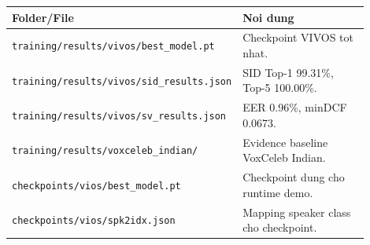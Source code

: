 \documentclass[12pt,a4paper]{article}
\begin{document}
\begin{longtable}{p{0.34\linewidth}p{0.56\linewidth}}
\toprule
\textbf{Folder/File} & \textbf{Noi dung} \\
\midrule
\endhead
\texttt{training/results/vivos/best\_model.pt} & Checkpoint VIVOS tot nhat. \\
\texttt{training/results/vivos/sid\_results.json} & SID Top-1 99.31\%, Top-5 100.00\%. \\
\texttt{training/results/vivos/sv\_results.json} & EER 0.96\%, minDCF 0.0673. \\
\texttt{training/results/voxceleb\_indian/} & Evidence baseline VoxCeleb Indian. \\
\texttt{checkpoints/vios/best\_model.pt} & Checkpoint dung cho runtime demo. \\
\texttt{checkpoints/vios/spk2idx.json} & Mapping speaker class cho checkpoint. \\
\bottomrule
\end{longtable}
\end{document}
